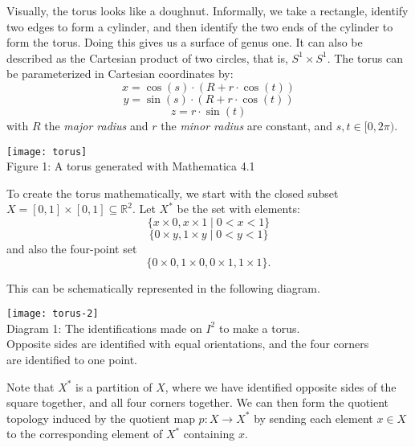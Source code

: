 \documentclass[12pt]{article}
\begin{document}
Visually, the torus looks like a doughnut. Informally, we take a rectangle, identify two edges to form a cylinder, and then identify the two ends of the cylinder to form the torus. Doing this gives us a surface of genus one. It can also be described as the Cartesian product of two circles, that is, $S^1 \times S^1$. The torus can be parameterized in Cartesian coordinates by:
$$x = \cos(s) \cdot(R + r \cdot \cos(t))$$
$$y = \sin(s) \cdot (R + r \cdot \cos(t))$$
$$z = r \cdot \sin(t)$$
with $R$ the \emph{major radius} and $r$ the \emph{minor radius} are constant, and $s,t \in [0,2\pi)$.

\begin{center}
\texttt{[image: torus]} \\
\tiny{Figure 1: A torus generated with Mathematica 4.1}
\end{center}

To create the torus mathematically, we start with the closed subset $X = [0,1] \times [0,1] \subseteq \mathbb{R}^2$. Let $X^*$ be the set with elements:
$$\{ x \times 0, x \times 1 \mid 0 < x < 1 \}$$
$$\{ 0 \times y, 1 \times y \mid 0 < y < 1 \}$$
and also the four-point set
$$\{ 0 \times 0, 1 \times 0, 0 \times 1, 1 \times 1 \}.$$

This can be schematically represented in the following diagram.
\begin{center}
\texttt{[image: torus-2]} \\
\tiny{Diagram 1: The identifications made on $I^2$ to make a torus. \\ Opposite sides are identified with equal orientations, and the four corners \\
are identified to one point.}
\end{center}

Note that $X^*$ is a partition of $X$, where we have identified opposite sides of the square together, and all four corners together. We can then form the quotient topology induced by the quotient map $p\colon X \longrightarrow X^*$ by sending each element $x \in X$ to the corresponding element of $X^*$ containing $x$. \\
\end{document}
